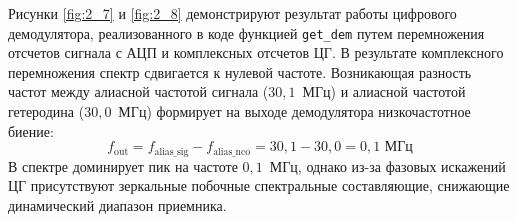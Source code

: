 Рисунки \ref{fig:2_7} и \ref{fig:2_8} демонстрируют результат работы цифрового демодулятора, реализованного в коде функцией \texttt{get\_dem} путем перемножения отсчетов сигнала с АЦП и комплексных отсчетов ЦГ. В результате комплексного перемножения спектр сдвигается к нулевой частоте. Возникающая разность частот между алиасной частотой сигнала ($30{,}1$~МГц) и алиасной частотой гетеродина ($30{,}0$~МГц) формирует на выходе демодулятора низкочастотное биение:
$$f_{\text{out}} = f_{\text{alias\_sig}} - f_{\text{alias\_nco}} = 30{,}1 - 30{,}0 = 0{,}1 \text{ МГц}$$
В спектре доминирует пик на частоте $0{,}1$~МГц, однако из-за фазовых искажений ЦГ присутствуют зеркальные побочные спектральные составляющие, снижающие динамический диапазон приемника.
\newpage
